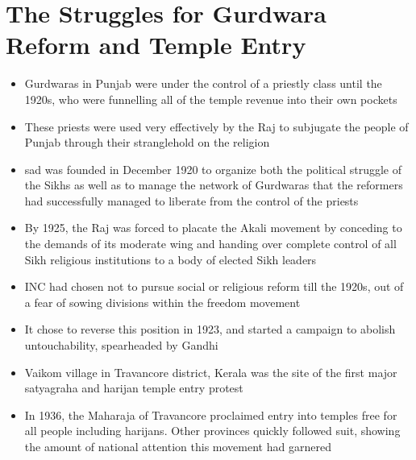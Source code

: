 \section{The Struggles for Gurdwara Reform and Temple Entry}
\begin{itemize}
    \item Gurdwaras in Punjab were under the control of a priestly class until the 1920s, who were funnelling all of the temple revenue into their own pockets
    \item These priests were used very effectively by the Raj to subjugate the people of Punjab through their stranglehold on the religion
    \item \gls{sad} was founded in December 1920 to organize both the political struggle of the Sikhs as well as to manage the network of Gurdwaras that the reformers had successfully managed to liberate from the control of the priests
    \item By 1925, the Raj was forced to placate the Akali movement by conceding to the demands of its moderate wing and handing over complete control of all Sikh religious institutions to a body of elected Sikh leaders
    \item INC had chosen not to pursue social or religious reform till the 1920s, out of a fear of sowing divisions within the freedom movement
    \item It chose to reverse this position in 1923, and started a campaign to abolish untouchability, spearheaded by Gandhi
    \item Vaikom village in Travancore district, Kerala was the site of the first major satyagraha and harijan temple entry protest
    \item In 1936, the Maharaja of Travancore proclaimed entry into temples free for all people including harijans. Other provinces quickly followed suit, showing the amount of national attention this movement had garnered
\end{itemize}


